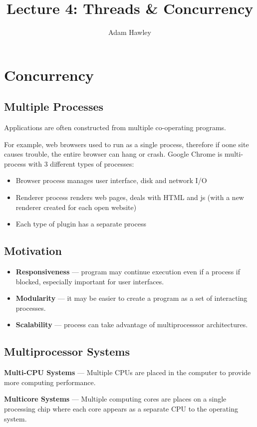 \documentclass{article}
\title{Lecture 4: Threads \& Concurrency}
\author{Adam Hawley}
\begin{document}
\maketitle
\tableofcontents
\newpage

\section{Concurrency}
\subsection{Multiple Processes}
Applications are often constructed from multiple co-operating programs.

For example, web browsers used to run as a single process, therefore if oone site causes trouble, the entire browser can hang or crash.
Google Chrome is multi-process with 3 different types of processes:
\begin{itemize}
	\item Browser process manages user interface, disk and network I/O
	\item Renderer process renders web pages, deals with HTML and js (with a new renderer created for each open website)
	\item Each type of plugin has a separate process
\end{itemize}

\subsection{Motivation}
\begin{itemize}
	\item \textbf{Responsiveness} --- program may continue execution even if a process if blocked, especially important for user interfaces.
	\item \textbf{Modularity} --- it may be easier to create a program as a set of interacting processes. 
	\item \textbf{Scalability} --- process can take advantage of multiprocesssor architectures.
\end{itemize}

\subsection{Multiprocessor Systems}
\textbf{Multi-CPU Systems} --- Multiple CPUs are placed in the computer to provide more computing performance.

\textbf{Multicore Systems} --- Multiple computing cores are places on a single processing chip where each core appears as a separate CPU to the operating system.
\end{document}
